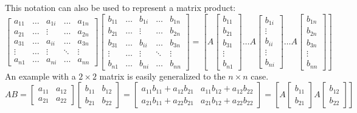 \documentclass[../main.tex]{subfiles}
\begin{document}
This notation can also be used to represent a matrix product:
\begin{equation}
\label{eq:eq_2_3}
\begin{bmatrix}
a_{11} & \ldots & a_{1 i} & \ldots & a_{1 n} \\
a_{21} & \ldots & \vdots & \ldots & a_{2 n} \\
a_{31} & \ldots & a_{i i} & \ldots & a_{3 n} \\
\vdots & \ldots & \vdots & \ddots & \vdots \\
a_{n 1} & \ldots & a_{n i} & \ldots & a_{n n}
\end{bmatrix}
\begin{bmatrix}
b_{11} & \ldots & b_{1 i} & \ldots & b_{1 n} \\
b_{21} & \ldots & \vdots & \ldots & b_{2 n} \\
b_{31} & \ldots & b_{i i} & \ldots & b_{3 n} \\
\vdots & \ldots & \vdots & \ddots & \vdots \\
b_{n 1} & \ldots & b_{n i} & \ldots & b_{n n}
\end{bmatrix} =
\left[A\left[\begin{array}{c}
b_{11} \\
b_{21} \\
b_{31} \\
\vdots \\
b_{n 1}
\end{array}\right] \ldots A\left[\begin{array}{c}
b_{1 i} \\
\vdots \\
b_{i i} \\
\vdots \\
b_{n i}
\end{array}\right] \ldots A\left[\begin{array}{c}
b_{1 n} \\
b_{2 n} \\
b_{3 n} \\
\vdots \\
b_{n n}
\end{array}\right]\right]
\end{equation}
An example with a $2 \times 2$ matrix is easily generalized to the $n \times n$ case.
$$
A B=\left[\begin{array}{ll}
a_{11} & a_{12} \\
a_{21} & a_{22}
\end{array}\right]\left[\begin{array}{ll}
b_{11} & b_{12} \\
b_{21} & b_{22}
\end{array}\right]=\left[\begin{array}{ll}
a_{11} b_{11}+a_{12} b_{21} & a_{11} b_{12}+a_{12} b_{22} \\
a_{21} b_{11}+a_{22} b_{21} & a_{21} b_{12}+a_{22} b_{22}
\end{array}\right]=\left[A\left[\begin{array}{l}
b_{11} \\
b_{21}
\end{array}\right] A\left[\begin{array}{l}
b_{12} \\
b_{22}
\end{array}\right]\right]
$$
\end{document}
